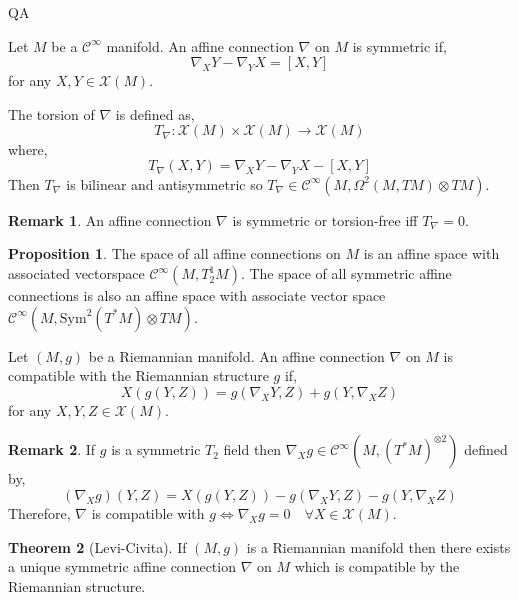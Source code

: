 QA	 \documentclass[12pt]{extarticle}
\theoremstyle{definition}
\newtheorem{theorem}{Theorem}[section]
\newtheorem{proposition}[theorem]{Proposition}
\newtheorem{remark}{Remark}
\newenvironment{definition}[1][Definition:]{\begin{trivlist}
\item[\hskip \labelsep {\bfseries #1}]}{\end{trivlist}}
\newcommand{\C}[1]{\mathcal{C}^{#1}}
\begin{document}
\begin{definition}
Let $M$ be a $\C{\infty}$ manifold. An affine connection $\nabla$ on $M$ is symmetric if,
\[ \nabla_X Y - \nabla_Y X = [X, Y] \]
for any $X, Y \in \mathscr{X}(M)$. 
\end{definition}

\begin{definition}
The torsion of $\nabla$ is defined as,
\[ T_{\nabla} : \mathscr{X}(M) \times \mathscr{X}(M) \to \mathscr{X}(M) \]
where,
\[ T_{\nabla}(X, Y) = \nabla_X Y - \nabla_Y X - [X, Y] \]
Then $T_{\nabla}$ is bilinear and antisymmetric so $T_{\nabla} \in \C{\infty}(M, \Omega^2(M, TM) \otimes TM)$. 
\end{definition}

\begin{remark}
An affine connection $\nabla$ is symmetric or torsion-free iff $T_{\nabla} = 0$.
\end{remark}

\begin{proposition}
The space of all affine connections on $M$ is an affine space with associated vectorspace $\C{\infty}(M, T^1_2 M)$. The space of all symmetric affine connections is also an affine space with associate vector space $\C{\infty}(M, \mathrm{Sym}^2(T^*M) \otimes TM)$. 
\end{proposition}

\begin{definition}
Let $(M, g)$ be a Riemannian manifold. An affine connection $\nabla$ on $M$ is compatible with the Riemannian structure $g$ if,
\[ X(g(Y,Z)) = g(\nabla_X Y, Z) + g(Y, \nabla_X Z) \]
for any $X,Y,Z \in \mathscr{X}(M)$. 
\end{definition}

\begin{remark}
If $g$ is a symmetric $T_2$ field then $\nabla_X g \in \C{\infty}(M, (T^* M)^{\otimes 2})$ defined by,
\[ (\nabla_X g)(Y, Z) = X(g(Y, Z)) - g(\nabla_X Y, Z) - g(Y, \nabla_X Z) \]
Therefore, $\nabla$ is compatible with $g \iff \nabla_X g = 0 \quad \forall X \in \mathscr{X}(M)$. 
\end{remark}

\begin{theorem}[Levi-Civita]
If $(M, g)$ is a Riemannian manifold then there exists a unique symmetric affine connection $\nabla$ on $M$ which is compatible by the Riemannian structure. 
\end{theorem}
\end{document}
